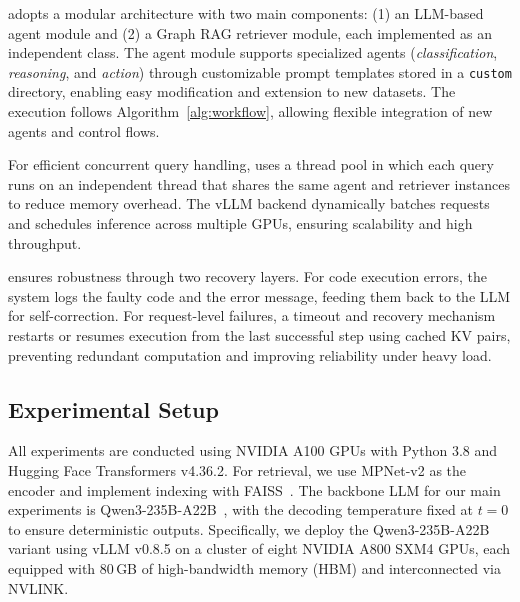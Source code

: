 \projectname adopts a modular architecture with two main components: (1) an LLM-based agent module and (2) a Graph RAG retriever module, each implemented as an independent class. The agent module supports specialized agents (\textit{classification}, \textit{reasoning}, and \textit{action}) through customizable prompt templates stored in a \texttt{custom} directory, enabling easy modification and extension to new datasets. The execution follows Algorithm~\ref{alg:workflow}, allowing flexible integration of new agents and control flows.

For efficient concurrent query handling, \projectname uses a thread pool in which each query runs on an independent thread that shares the same agent and retriever instances to reduce memory overhead. The vLLM backend dynamically batches requests and schedules inference across multiple GPUs, ensuring scalability and high throughput.

\projectname ensures robustness through two recovery layers. For code execution errors, the system logs the faulty code and the error message, feeding them back to the LLM for self-correction. For request-level failures, a timeout and recovery mechanism restarts or resumes execution from the last successful step using cached KV pairs, preventing redundant computation and improving reliability under heavy load.

\subsection{Experimental Setup}

 All experiments are conducted using NVIDIA A100 GPUs with Python 3.8 and Hugging Face Transformers v4.36.2. For retrieval, we use MPNet-v2 as the encoder and implement indexing with FAISS~\cite{johnson2019billion}. The backbone LLM for our main experiments is Qwen3-235B-A22B~\cite{qwen}, with the decoding temperature fixed at $t = 0$ to ensure deterministic outputs. Specifically, we deploy the Qwen3-235B-A22B variant using vLLM v0.8.5 on a cluster of eight NVIDIA A800 SXM4 GPUs, each equipped with 80\,GB of high-bandwidth memory (HBM) and interconnected via NVLINK.

